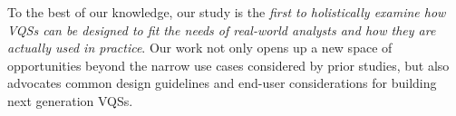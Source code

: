 To the best of our knowledge, our study is the \emph{first to holistically examine how VQSs can be designed to fit the needs of real-world analysts and how they are actually used in practice}. Our work not only opens up a new space of opportunities beyond the narrow use cases considered by prior studies, but also advocates common design guidelines and end-user considerations for building next generation VQSs. %


